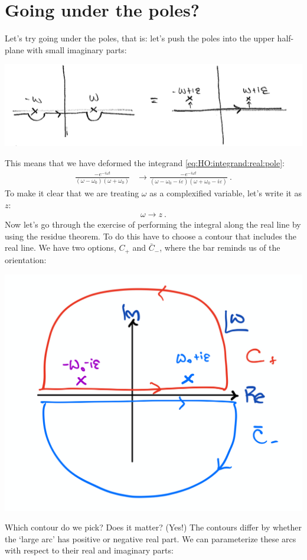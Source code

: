 \documentclass[
  11pt,
	colorful,
	raggedright,
]{tufte-style-thesis-flip}
\begin{document}
\section{Going under the poles?}
Let's try going under the poles, that is: let's push the poles into the upper half-plane with small imaginary parts:
\begin{center}
\includegraphics[width=.6\textwidth]{figures/Lec_2017_16_underpole.png}
\end{center}
This means that we have deformed the integrand \eqref{eq:HO:integrand:real:pole}:
\begin{align}
\frac{-e^{-i\omega t}}{(\omega - \omega_0)(\omega + \omega_0)}
&\to
\frac{-e^{-i\omega t}}{(\omega - \omega_0 - i\varepsilon)(\omega + \omega_0 - i\varepsilon)} \ .
\label{eq:HO:integrand:upper:poles}
\end{align}
To make it clear that we are treating $\omega$ as a complexified variable, let's write it as $z$:
\begin{align}
  \omega \to z \ .
 \end{align}
Now let's go through the exercise of performing the integral along the real line by using the residue theorem. To do this have to choose a contour that includes the real line. We have two options, $C_+$ and $\bar C_-$, where the bar reminds us of the orientation:
\begin{center}
\includegraphics[width=.6\textwidth]{figures/Lec_2017_16_pokeup.pdf}
\end{center}
Which contour do we pick? Does it matter? (Yes!) The contours differ by whether the `large arc' has positive or negative real part. We can parameterize these arcs with respect to their real and imaginary parts:
\end{document}
